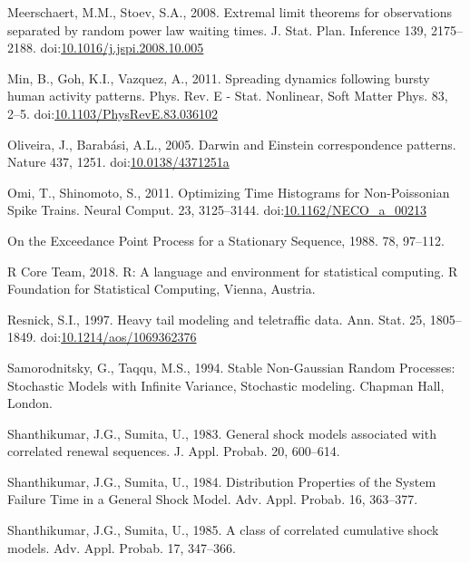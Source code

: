 \documentclass[]{elsarticle} %
\begin{document}
\leavevmode\hypertarget{ref-MeerschaertStoev08}{}%
Meerschaert, M.M., Stoev, S.A., 2008. Extremal limit theorems for
observations separated by random power law waiting times. J. Stat. Plan.
Inference 139, 2175--2188.
doi:\href{https://doi.org/10.1016/j.jspi.2008.10.005}{10.1016/j.jspi.2008.10.005}

\leavevmode\hypertarget{ref-Min2010}{}%
Min, B., Goh, K.I., Vazquez, A., 2011. Spreading dynamics following
bursty human activity patterns. Phys. Rev. E - Stat. Nonlinear, Soft
Matter Phys. 83, 2--5.
doi:\href{https://doi.org/10.1103/PhysRevE.83.036102}{10.1103/PhysRevE.83.036102}

\leavevmode\hypertarget{ref-Oliveira2005}{}%
Oliveira, J., Barabási, A.L., 2005. Darwin and Einstein correspondence
patterns. Nature 437, 1251.
doi:\href{https://doi.org/10.0138/4371251a}{10.0138/4371251a}

\leavevmode\hypertarget{ref-Omi2011}{}%
Omi, T., Shinomoto, S., 2011. Optimizing Time Histograms for
Non-Poissonian Spike Trains. Neural Comput. 23, 3125--3144.
doi:\href{https://doi.org/10.1162/NECO_a_00213}{10.1162/NECO\_a\_00213}

\leavevmode\hypertarget{ref-Hsing88}{}%
On the Exceedance Point Process for a Stationary Sequence, 1988. 78,
97--112.

\leavevmode\hypertarget{ref-R}{}%
R Core Team, 2018. R: A language and environment for statistical
computing. R Foundation for Statistical Computing, Vienna, Austria.

\leavevmode\hypertarget{ref-Resnick97}{}%
Resnick, S.I., 1997. Heavy tail modeling and teletraffic data. Ann.
Stat. 25, 1805--1849.
doi:\href{https://doi.org/10.1214/aos/1069362376}{10.1214/aos/1069362376}

\leavevmode\hypertarget{ref-SamorodnitskyTaqqu}{}%
Samorodnitsky, G., Taqqu, M.S., 1994. Stable Non-Gaussian Random
Processes: Stochastic Models with Infinite Variance, Stochastic
modeling. Chapman Hall, London.

\leavevmode\hypertarget{ref-Sumita1983}{}%
Shanthikumar, J.G., Sumita, U., 1983. General shock models associated
with correlated renewal sequences. J. Appl. Probab. 20, 600--614.

\leavevmode\hypertarget{ref-Sumita1984}{}%
Shanthikumar, J.G., Sumita, U., 1984. Distribution Properties of the
System Failure Time in a General Shock Model. Adv. Appl. Probab. 16,
363--377.

\leavevmode\hypertarget{ref-Sumita1985}{}%
Shanthikumar, J.G., Sumita, U., 1985. A class of correlated cumulative
shock models. Adv. Appl. Probab. 17, 347--366.
\end{document}
